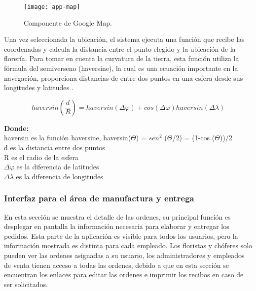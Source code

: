 \begin{figure}[H]
  \centering
  \texttt{[image: app-map]}
  \caption{Componente de Google Map.}
\end{figure}

Una vez seleccionada la ubicación, el sistema ejecuta una función que recibe las coordenadas y calcula la distancia entre el punto elegido y la ubicación de la florería. Para tomar en cuenta la curvatura de la tierra, esta función utiliza la fórmula del semiverseno (haversine), la cual es una ecuación importante en la navegación, proporciona distancias de entre dos puntos en una esfera desde sus longitudes y latitudes \cite{anisya}.

\[ 
  haversin\left(\frac{d}{R}\right) = haversin(\Delta\varphi) + cos(\Delta\varphi)haversin(\Delta\lambda)
\]

\textbf{Donde:}\\
\-\hspace{0.5cm} haversin es la función haversine, haversin($\Theta$) = $sen^2$ ($\Theta$/2) = (1-cos ($\Theta$))/2\\
\-\hspace{0.5cm} d es la distancia entre dos puntos\\
\-\hspace{0.5cm} R es el radio de la esfera\\
\-\hspace{0.5cm} $\Delta\varphi$ es la diferencia de latitudes\\
\-\hspace{0.5cm} $\Delta\lambda$ es la diferencia de longitudes
\vspace{0.8cm}



\subsubsection{Interfaz para el área de manufactura y entrega}
En esta sección se muestra el detalle de las ordenes, su principal función es desplegar en pantalla la información necesaria para elaborar y entregar los pedidos. Esta parte de la aplicación es visible para todos los usuarios, pero la información mostrada es distinta para cada empleado. Los floristas y chóferes solo pueden ver las ordenes asignadas a su usuario, los administradores y empleados de venta tienen acceso a todas las ordenes, debido a que en esta sección se encuentran los enlaces para editar las ordenes e imprimir los recibos en caso de ser solicitados.
\vspace{0.8cm}

